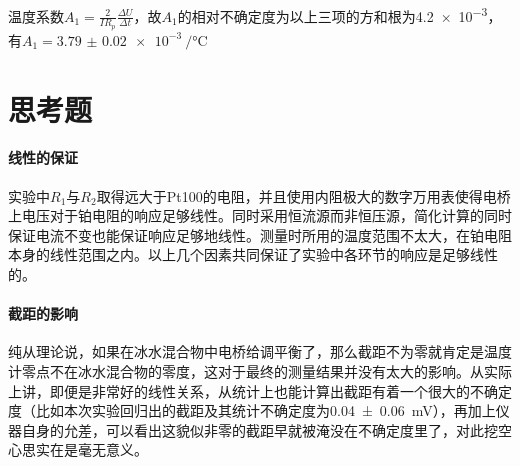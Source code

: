 \documentclass[UTF8]{ctexart}
\begin{document}
温度系数$A_1=\frac{2}{IR_p}\frac{\Delta U}{\Delta t}$，故$A_1$的相对不确定度为以上三项的方和根为\num{4.2e-3}，有$A_1=\SI{3.79(2)e-3}{\per\celsius}$
\section*{思考题}
\paragraph{线性的保证}
实验中$R_1$与$R_2$取得远大于Pt100的电阻，并且使用内阻极大的数字万用表使得电桥上电压对于铂电阻的响应足够线性。同时采用恒流源而非恒压源，简化计算的同时保证电流不变也能保证响应足够地线性。测量时所用的温度范围不太大，在铂电阻本身的线性范围之内。以上几个因素共同保证了实验中各环节的响应是足够线性的。
\paragraph{截距的影响}
纯从理论说，如果在冰水混合物中电桥给调平衡了，那么截距不为零就肯定是温度计零点不在冰水混合物的零度，这对于最终的测量结果并没有太大的影响。从实际上讲，即便是非常好的线性关系，从统计上也能计算出截距有着一个很大的不确定度（比如本次实验回归出的截距及其统计不确定度为\SI{.04(6)}{\milli\volt}），再加上仪器自身的允差，可以看出这貌似非零的截距早就被淹没在不确定度里了，对此挖空心思实在是毫无意义。
\end{document}
